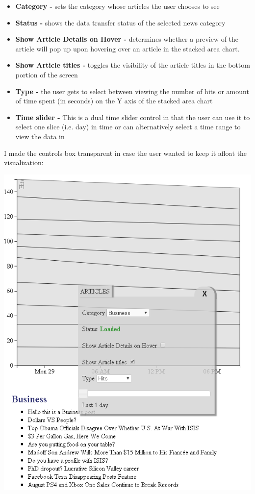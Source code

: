 \documentclass[12pt]{article}
\begin{document}
\begin{itemize}
\item \textbf{Category - } sets the category whose articles the user chooses to see
\item \textbf{Status - } shows the data transfer status of the selected news category
\item \textbf{Show Article Details on Hover - } determines whether a preview of the article will pop up upon hovering over an article in the stacked area chart. 
\item \textbf{Show Article titles - } toggles the visibility of the article titles in the bottom portion of the screen
\item \textbf{Type - } the user gets to select between viewing the number of hits or amount of time spent (in seconds) on the Y axis of the stacked area chart
\item \textbf{Time slider - } This is a dual time slider control in that the user can use it to select one slice (i.e. day) in time or can alternatively select a time range to view the data in 
\end{itemize}

\noindent I made the controls box transparent in case the user wanted to keep it afloat the visualization:

\noindent\includegraphics[scale=0.9]{img/viz_6}
\end{document}
